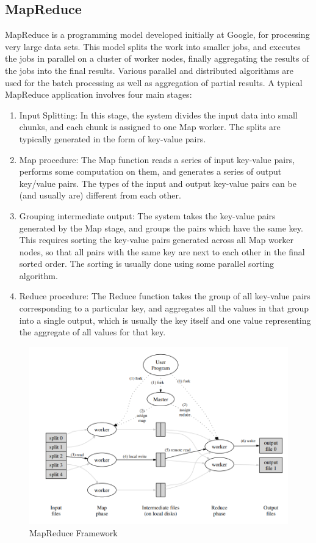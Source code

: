 \documentclass{article}
\begin{document}
\subsection{MapReduce}
MapReduce is a programming model developed initially at Google, for processing very large data sets. This model splits the work into smaller jobs, and executes the jobs in parallel on a cluster of worker nodes, finally aggregating the results of the jobs into the final results. Various parallel and distributed algorithms are used for the batch processing as well as aggregation of partial results. A typical MapReduce application involves four main stages:
 \begin{enumerate}
     \item Input Splitting: In this stage, the system divides the input data into small chunks, and each chunk is assigned to one Map worker. The splits are typically generated in the form of key-value pairs.
     \item Map procedure: The Map function reads a series of input key-value pairs, performs some computation on them, and generates a series of output key/value pairs. The types of the input and output key-value pairs can be (and usually are) different from each other.
     \item Grouping intermediate output: The system takes the key-value pairs generated by the Map stage, and groups the pairs which have the same key. This requires sorting the key-value pairs generated across all Map worker nodes, so that all pairs with the same key are next to each other in the final sorted order. The sorting is usually done using some parallel sorting algorithm.
     \item Reduce procedure: The Reduce function takes the group of all key-value pairs corresponding to a particular key, and aggregates all the values in that group into a single output, which is usually the key itself and one value representing the aggregate of all values for that key.
 \end{enumerate}

\begin{figure}[ht]
    \centering
    \includegraphics[width=1\linewidth]{./images/mapreduce.png}
    \caption{MapReduce Framework \cite{mapreduce}}
    \label{fig:mapreduce}
\end{figure}
\end{document}
